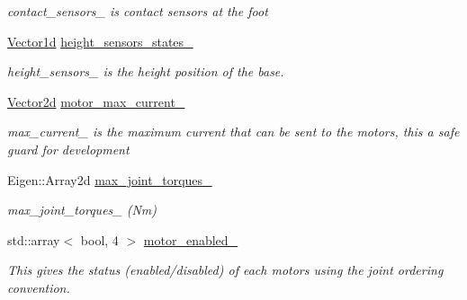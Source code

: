 \begin{DoxyCompactItemize}
\begin{DoxyCompactList}\small\item\em contact\+\_\+sensors\+\_\+ is contact sensors at the foot \end{DoxyCompactList}\item 
\mbox{\label{classblmc__robots_1_1Teststand_af9c7f9537b7123dae498d08d5c80fe07}} 
\hyperlink{common__header_8hpp_a932c1319d78144ebcaa8938ae070b784}{Vector1d} \hyperlink{classblmc__robots_1_1Teststand_af9c7f9537b7123dae498d08d5c80fe07}{height\+\_\+sensors\+\_\+states\+\_\+}
\begin{DoxyCompactList}\small\item\em height\+\_\+sensors\+\_\+ is the height position of the base. \end{DoxyCompactList}\item 
\mbox{\label{classblmc__robots_1_1Teststand_aae2cff55630f887e4ed10af78b7dd0c1}} 
\hyperlink{common__header_8hpp_acb6916bc8c9fe9d98c484fd4cc201447}{Vector2d} \hyperlink{classblmc__robots_1_1Teststand_aae2cff55630f887e4ed10af78b7dd0c1}{motor\+\_\+max\+\_\+current\+\_\+}
\begin{DoxyCompactList}\small\item\em max\+\_\+current\+\_\+ is the maximum current that can be sent to the motors, this a safe guard for development \end{DoxyCompactList}\item 
\mbox{\label{classblmc__robots_1_1Teststand_acf65e7889b3c8b3cbfa8b9e82e984b22}} 
Eigen\+::\+Array2d \hyperlink{classblmc__robots_1_1Teststand_acf65e7889b3c8b3cbfa8b9e82e984b22}{max\+\_\+joint\+\_\+torques\+\_\+}
\begin{DoxyCompactList}\small\item\em max\+\_\+joint\+\_\+torques\+\_\+ (Nm) \end{DoxyCompactList}\item 
\mbox{\label{classblmc__robots_1_1Teststand_aedd9aae28f47062870e3afcb9474822b}} 
std\+::array$<$ bool, 4 $>$ \hyperlink{classblmc__robots_1_1Teststand_aedd9aae28f47062870e3afcb9474822b}{motor\+\_\+enabled\+\_\+}
\begin{DoxyCompactList}\small\item\em This gives the status (enabled/disabled) of each motors using the joint ordering convention. \end{DoxyCompactList}\item 

\end{DoxyCompactItemize}

